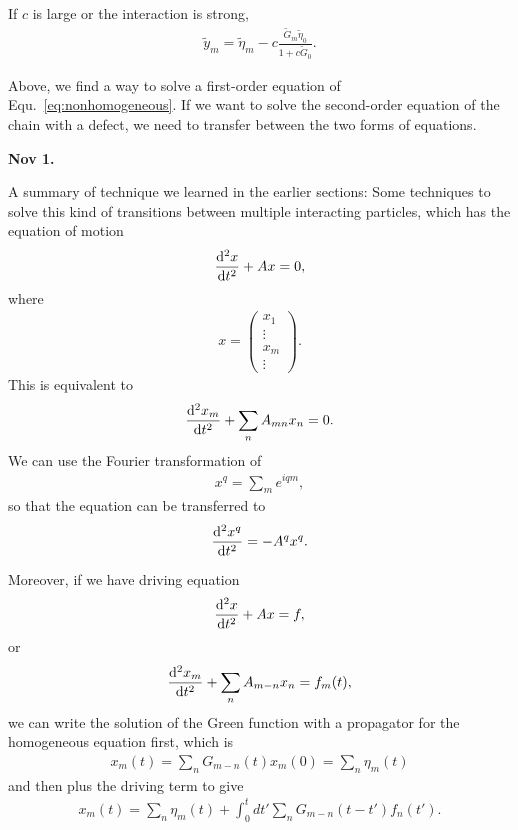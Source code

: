 If $ c $ is large or the interaction is strong, 
\begin{align}
\tilde{y}_m = \tilde{\eta}_m -c \frac{\tilde{G}_m\tilde{\eta}_0}{1+c\tilde{G}_0}.
\end{align}

Above, we find a way to solve a first-order equation of Equ.~\ref{eq:nonhomogeneous}. If we want to solve the second-order equation of the chain with a defect, we need to transfer between the two forms of equations. 



\textbf{Nov 1.}

A summary of technique we learned in the earlier sections: Some techniques to solve this kind of transitions between multiple interacting particles, which has the equation of motion
\begin{align}
\frac{{\mathrm d}^2 {x}}{{\mathrm d}t^2}+ Ax=0,
\end{align}
where 
\begin{align}
x=\left( \begin{array}{c}
x_1\\
\vdots\\
x_m\\
\vdots
\end{array} \right).
\end{align}
This is equivalent to 
\begin{align}
\frac{{\mathrm d}^2 {x_m}}{{\mathrm d}t^2}+ \sum_n A_{mn}x_n=0.
\end{align}
We can use the Fourier transformation of
\begin{align}
x^q=\sum_m e^{iqm},
\end{align}
so that the equation can be transferred to 
\begin{align}
\frac{{\mathrm d}^2 {x^q}}{{\mathrm d}t^2}=-A^q x^q.
\end{align}

Moreover, if we have driving equation
\begin{align}
\frac{{\mathrm d}^2 {x}}{{\mathrm d}t^2}+ Ax=f,
\end{align}
or 
\begin{align}
\frac{{\mathrm d}^2 {x_m}}{{\mathrm d}t^2}+ \sum_n A_{m-n}x_n=f_m(t),
\end{align}
we can write the solution of the Green function with a propagator for the homogeneous equation first, which is
\begin{align}
x_m(t) =\sum_n G_{m-n}(t)x_m (0)=\sum_n \eta_m (t)
\end{align}
and then plus the driving term to give 
\begin{align}
x_m(t) =\sum_n \eta_m (t) + \int_0^t dt' \sum_n G_{m-n}(t-t')f_n(t').
\end{align}

